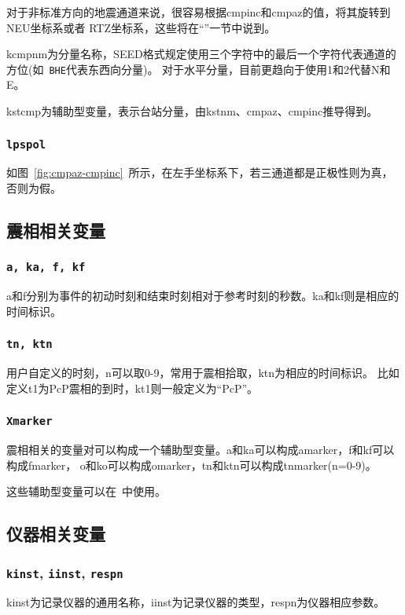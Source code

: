对于非标准方向的地震通道来说，很容易根据cmpinc和cmpaz的值，将其旋转到NEU坐标系或者
RTZ坐标系，这些将在``''一节中说到。

kcmpnm为分量名称，SEED格式规定使用三个字符中的最后一个字符代表通道的方位(如~\verb+BHE+代表东西向分量)。
对于水平分量，目前更趋向于使用1和2代替N和E。

kstcmp为辅助型变量，表示台站分量，由kstnm、cmpaz、cmpinc推导得到。

\subsubsection{\texttt{lpspol}}
如图~\ref{fig:cmpaz-cmpinc}~所示，在左手坐标系下，若三通道都是正极性则为真，否则为假。

\subsection{震相相关变量}
\subsubsection{\texttt{a, ka, f, kf}}
a和f分别为事件的初动时刻和结束时刻相对于参考时刻的秒数。ka和kf则是相应的时间标识。

\subsubsection{\texttt{tn, ktn}}
用户自定义的时刻，n可以取0-9，常用于震相拾取，ktn为相应的时间标识。
比如定义t1为PcP震相的到时，kt1则一般定义为``PcP''。

\subsubsection{\texttt{Xmarker}}
震相相关的变量对可以构成一个辅助型变量。a和ka可以构成amarker，f和kf可以构成fmarker，
o和ko可以构成omarker，tn和ktn可以构成tnmarker(n=0-9)。

这些辅助型变量可以在~中使用。

\subsection{仪器相关变量}
\subsubsection{\texttt{kinst}, \texttt{iinst}\dag, \texttt{respn}\dag}
kinst为记录仪器的通用名称，iinst为记录仪器的类型，respn为仪器相应参数。

